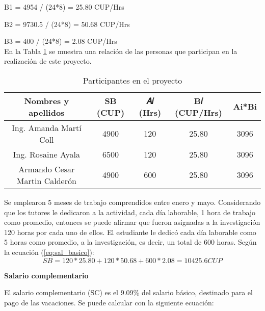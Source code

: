 B1 = 4954 / (24*8) = 25.80 CUP/Hrs

B2 = 9730.5 / (24*8) = 50.68 CUP/Hrs

B3 = 400 / (24*8) = 2.08 CUP/Hrs\\

En la Tabla \ref{table:participantes_proyecto} se muestra una relación de las personas que participan en la realización de este proyecto. \\


\begin{table}[H]
    \caption{Participantes en el proyecto}
    \label{table:participantes_proyecto}

    \begin{tabular}{|c|c|c|c|c|}
        \hline
        \textbf{Nombres y apellidos}  & \textbf{SB (CUP)} & \textbf{𝐴𝑖 (Hrs)} & \textbf{B𝑖 (CUP/Hrs)} & \textbf{Ai*Bi} \\
        \hline
        Ing. Amanda Martí Coll        & 4900              & 120               & 25.80                 & 3096           \\
        Ing. Rosaine Ayala            & 6500              & 120               & 25.80                 & 3096           \\
        Armando Cesar Martin Calderón & 4900              & 600               & 25.80                 & 3096           \\

        \hline
    \end{tabular}
\end{table}


Se emplearon 5 meses de trabajo comprendidos entre enero y mayo. Considerando que los tutores le dedicaron a la actividad, cada día laborable, 1 hora de trabajo como promedio, entonces se puede afirmar que fueron asignadas a la investigación 120 horas por cada uno de ellos.
El estudiante le dedicó cada día laborable como 5 horas como promedio, a la investigación, es decir, un total de 600 horas.
Según la ecuación (\ref{eq:sal_basico}):\\

\begin{equation}
    \label{eq:salary_basico_total}
    SB = 120 * 25.80 + 120 * 50.68 + 600 * 2.08 = 10425.6 CUP
\end{equation}


\textbf{Salario complementario}

El salario complementario (SC) es el 9.09\% del salario básico, destinado para el pago de las
vacaciones. Se puede calcular con la siguiente ecuación:

